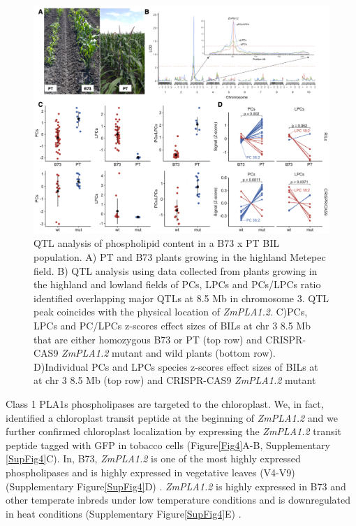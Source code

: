 \documentclass[9pt,twocolumn,twoside]{BioRxiv}
\begin{document}
\begin{figure}[h]
\begin{center}
\includegraphics[width=0.8\paperwidth]{Figures/Fig_3.png}
\caption{QTL analysis of phospholipid content in a B73 x PT BIL population. 
A) PT and B73 plants growing in the highland Metepec field. 
B) QTL analysis using data collected from plants growing in the highland and lowland fields of PCs, LPCs and PCs/LPCs ratio identified overlapping major QTLs at 8.5 Mb in chromosome 3. 
QTL peak coincides with the physical location of \textit{ZmPLA1.2}. 
C)PCs, LPCs and PC/LPCs z-scores effect sizes of BILs at chr 3 8.5 Mb that are either homozygous B73 or PT (top row) and CRISPR-CAS9 \textit{ZmPLA1.2} mutant and wild plants (bottom row).        
D)Individual PCs and LPCs species z-scores effect sizes of BILs at at chr 3 8.5 Mb (top row) and CRISPR-CAS9 \textit{ZmPLA1.2} mutant}
\label{Fig3}
\end{center}
\end{figure} 
Class 1 PLA1s phospholipases are targeted to the chloroplast. We, in fact, identified a chloroplast transit peptide at the beginning of \textit{ZmPLA1.2} and we further confirmed chloroplast localization by expressing the \textit{ZmPLA1.2} transit peptide tagged with GFP in tobacco cells (Figure\ref{Fig4}A-B, Supplementary \ref{SupFig4}C). 
In, B73, \textit{ZmPLA1.2} is one of the most highly expressed phospholipases and is highly expressed in vegetative leaves (V4-V9) (Supplementary Figure\ref{SupFig4}D) \cite{Stelpflug2016-vr}. 
\textit{ZmPLA1.2} is highly expressed in B73 and other temperate inbreds under low temperature conditions and is downregulated in heat conditions (Supplementary Figure\ref{SupFig4}E) \cite{Waters2017-nat}.
\end{document}
